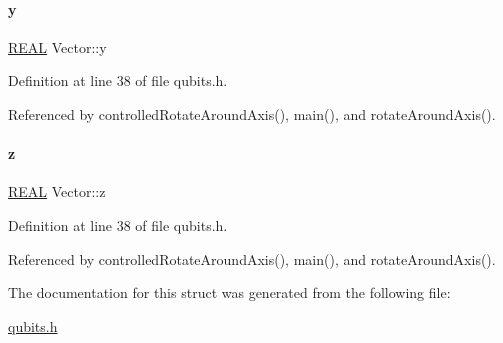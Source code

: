 \mbox{\label{structVector_a375ca805d4c808a53d7c4e0c737ae3de}} 
\paragraph{\texorpdfstring{y}{y}}
{\footnotesize\ttfamily \mbox{\hyperlink{precision_8h_a4b654506f18b8bfd61ad2a29a7e38c25}{R\+E\+AL}} Vector\+::y}



Definition at line 38 of file qubits.\+h.



Referenced by controlled\+Rotate\+Around\+Axis(), main(), and rotate\+Around\+Axis().

\mbox{\label{structVector_ad4e863651be7d6b7e2b28cd7445a0ccf}} 
\paragraph{\texorpdfstring{z}{z}}
{\footnotesize\ttfamily \mbox{\hyperlink{precision_8h_a4b654506f18b8bfd61ad2a29a7e38c25}{R\+E\+AL}} Vector\+::z}



Definition at line 38 of file qubits.\+h.



Referenced by controlled\+Rotate\+Around\+Axis(), main(), and rotate\+Around\+Axis().



The documentation for this struct was generated from the following file\+:\begin{DoxyCompactItemize}
\item 
\mbox{\hyperlink{qubits_8h}{qubits.\+h}}\end{DoxyCompactItemize}
